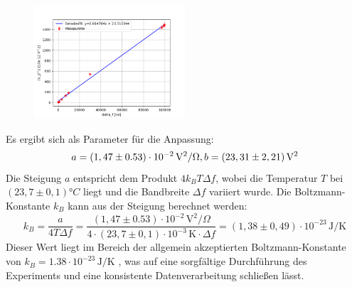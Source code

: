 \documentclass{article}
\begin{document}
\begin{figure}[htbp]
    \centering
    \includegraphics[width=0.5\textwidth]{figs/johnson_bandwith.png}
    \caption{}
    \label{fig:fit2}
\end{figure}
\FloatBarrier
Es ergibt sich als Parameter für die Anpassung:
\begin{equation}
a = (1,47 \pm 0.53) \cdot 10^{-2} \, \mathrm{V}^2/\Omega,   \\
b = (23,31 \pm 2,21) \, \mathrm{V}^2
\end{equation}
Die Steigung $a$ entspricht dem Produkt $4 k_B T \Delta f$, wobei die Temperatur $T$ bei $(23,7 \pm 0,1) °C$ liegt und die Bandbreite $\Delta f$ variiert wurde. Die Boltzmann-Konstante $k_B$ kann aus der Steigung berechnet werden:
\begin{equation}
k_B = \frac{a}{4 T \Delta f} = \frac{(1,47 \pm 0.53) \cdot 10^{-2} \,\mathrm{V}^2/\Omega}{4 \cdot (23,7 \pm 0,1) \cdot 10^{-3} \,\mathrm{K} \cdot \Delta f} = (1,38 \pm 0,49) \cdot 10^{-23} \,\mathrm{J/K}
\end{equation}
Dieser Wert liegt im Bereich der allgemein akzeptierten Boltzmann-Konstante von $k_B = 1.38 \cdot 10^{-23} \,\mathrm{J/K}$ \cite{boltzmann} %
, was auf eine sorgfältige Durchführung des Experiments und eine konsistente Datenverarbeitung schließen lässt.
\end{document}
